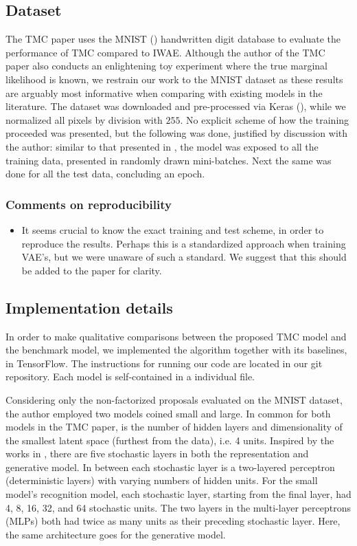 \subsection{Dataset}
The TMC paper uses the MNIST (\cite{mnist}) handwritten digit database to evaluate the performance of TMC compared to IWAE. Although the author of the TMC paper also conducts an enlightening toy experiment where the true marginal likelihood is known, we restrain our work to the MNIST dataset as these results are arguably most informative when comparing with existing models in the literature. The dataset was downloaded and pre-processed via Keras (\cite{keras}), while we normalized all pixels by division with $255$. No explicit scheme of how the training proceeded was presented, but the following was done, justified by discussion with the author: similar to that presented in \cite{iwae}, the model was exposed to all the training data, presented in randomly drawn mini-batches. Next the same was done for all the test data, concluding an epoch.

\subsubsection*{Comments on reproducibility}
\begin{itemize}
    \item It seems crucial to know the exact training and test scheme, in order to reproduce the results. Perhaps this is a standardized approach when training VAE's, but we were unaware of such a standard. We suggest that this should be added to the paper for clarity.
\end{itemize}

\subsection{Implementation details}
\label{sec:imp_details}
In order to make qualitative comparisons between the proposed TMC model and the benchmark model, we implemented the algorithm together with its baselines, in TensorFlow. The instructions for running our code are located in our git repository. Each model is self-contained in a individual file. 

Considering only the non-factorized proposals evaluated on the MNIST dataset, the author employed two models coined small and large. In common for both models in the TMC paper, is the number of hidden layers and dimensionality of the smallest latent space (furthest from the data), i.e. 4 units. Inspired by the works in \cite{ladder}, there are five stochastic layers in both the representation and generative model. In between each stochastic layer is a two-layered perceptron (deterministic layers) with varying numbers of hidden units. For the small model's recognition model, each stochastic layer, starting from the final layer, had 4, 8, 16, 32, and 64 stochastic units. The two layers in the multi-layer perceptrons (MLPs) both had twice as many units as their preceding stochastic layer. Here, the same architecture goes for the generative model. 

